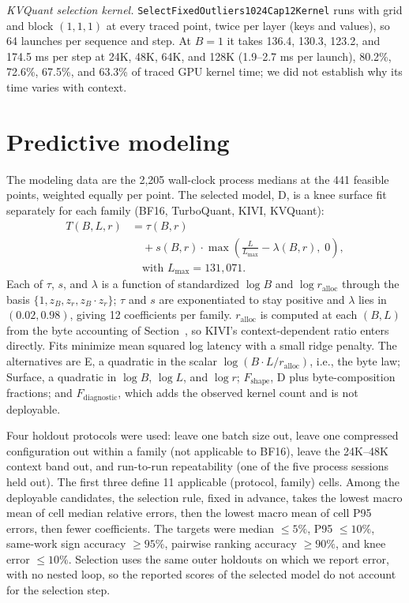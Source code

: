 \textit{KVQuant selection kernel.}
\texttt{SelectFixedOutliers1024Cap12Kernel} runs with grid and block $(1, 1, 1)$ at every traced point, twice per layer (keys and values), so 64 launches per sequence and step.
At $B = 1$ it takes 136.4, 130.3, 123.2, and 174.5 ms per step at 24K, 48K, 64K, and 128K (1.9--2.7 ms per launch), 80.2\%, 72.6\%, 67.5\%, and 63.3\% of traced GPU kernel time; we did not establish why its time varies with context.

\section{Predictive modeling}
\label{app:modeling}

The modeling data are the 2,205 wall-clock process medians at the 441 feasible points, weighted equally per point.
The selected model, D, is a knee surface fit separately for each family (BF16, TurboQuant, KIVI, KVQuant):
\[
\begin{aligned}
  T(B, L, r) &= \tau(B, r)\\
  &\quad + s(B, r) \cdot \max\!\left( \frac{L}{L_{\max}} - \lambda(B, r),\; 0 \right),\\
  &\quad \text{with } L_{\max} = 131{,}071.
\end{aligned}
\]
Each of $\tau$, $s$, and $\lambda$ is a function of standardized $\log B$ and $\log r_{\mathrm{alloc}}$ through the basis $\{1, z_B, z_r, z_B \cdot z_r\}$; $\tau$ and $s$ are exponentiated to stay positive and $\lambda$ lies in $(0.02, 0.98)$, giving 12 coefficients per family.
$r_{\mathrm{alloc}}$ is computed at each $(B, L)$ from the byte accounting of Section~, so KIVI's context-dependent ratio enters directly.
Fits minimize mean squared log latency with a small ridge penalty.
The alternatives are E, a quadratic in the scalar $\log(B \cdot L / r_{\mathrm{alloc}})$, i.e., the byte law; Surface, a quadratic in $\log B$, $\log L$, and $\log r$; $F_{\mathrm{shape}}$, D plus byte-composition fractions; and $F_{\mathrm{diagnostic}}$, which adds the observed kernel count and is not deployable.

Four holdout protocols were used: leave one batch size out, leave one compressed configuration out within a family (not applicable to BF16), leave the 24K--48K context band out, and run-to-run repeatability (one of the five process sessions held out).
The first three define 11 applicable (protocol, family) cells.
Among the deployable candidates, the selection rule, fixed in advance, takes the lowest macro mean of cell median relative errors, then the lowest macro mean of cell P95 errors, then fewer coefficients.
The targets were median $\leq 5\%$, P95 $\leq 10\%$, same-work sign accuracy $\geq 95\%$, pairwise ranking accuracy $\geq 90\%$, and knee error $\leq 10\%$.
Selection uses the same outer holdouts on which we report error, with no nested loop, so the reported scores of the selected model do not account for the selection step.

